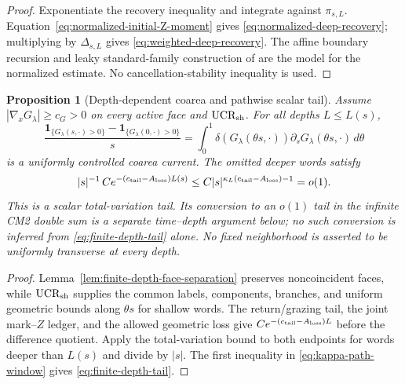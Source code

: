 \documentclass[11pt]{article}
\newtheorem{proposition}[theorem]{Proposition}
\newcommand{\one}{\mathbf 1}
\begin{document}
\begin{proof}
Exponentiate the recovery inequality and integrate against $\pi_{s,L}$.
Equation~\eqref{eq:normalized-initial-Z-moment} gives
\eqref{eq:normalized-deep-recovery}; multiplying by $\Delta_{s,L}$ gives
\eqref{eq:weighted-deep-recovery}.  The affine boundary recursion and leaky
standard-family construction of \cite{CanestrariHoles} are the model for
the normalized estimate.  No cancellation-stability inequality is used.
\end{proof}

\begin{proposition}[Depth-dependent coarea and pathwise scalar tail]
\label{prop:parameter-state-master-refinement}
Assume $|\nabla_xG_\lambda|\ge c_G>0$ on every active face and
$\mathrm{UCR}_{\rm sh}$.  For all depths
$L\le L(s)$,
\begin{equation}
\label{eq:master-coarea-difference}
 \frac{\one_{\{G_\lambda(s,\cdot)>0\}}
             -\one_{\{G_\lambda(0,\cdot)>0\}}}{s}
 =\int_0^1\delta(G_\lambda(\theta s,\cdot))
   \partial_sG_\lambda(\theta s,\cdot)\,d\theta
\end{equation}
is a uniformly controlled coarea current.  The omitted deeper words satisfy
\begin{equation}
\label{eq:finite-depth-tail}
 |s|^{-1}\,Ce^{-(c_{\rm tail}-A_{\rm loss})L(s)}
 \le C|s|^{\kappa_L(c_{\rm tail}-A_{\rm loss})-1}=o(1).
\end{equation}
This is a scalar total-variation tail.  Its conversion to an $o(1)$ tail in
the infinite CM2 double sum is a separate time--depth argument below; no such
conversion is inferred from \eqref{eq:finite-depth-tail} alone.  No fixed
neighborhood is asserted to be uniformly transverse at every depth.
\end{proposition}

\begin{proof}
Lemma~\ref{lem:finite-depth-face-separation} preserves noncoincident faces,
while $\mathrm{UCR}_{\rm sh}$ supplies the common labels, components, branches, and
uniform geometric bounds along $\theta s$ for shallow words.  The return/grazing tail,
the joint mark--$Z$ ledger, and the allowed geometric loss give
$Ce^{-(c_{\rm tail}-A_{\rm loss})L}$ before the difference quotient.  Apply
the total-variation bound to both endpoints for words deeper than $L(s)$ and
divide by $|s|$.  The first inequality in
\eqref{eq:kappa-path-window} gives \eqref{eq:finite-depth-tail}.
\end{proof}
\end{document}
